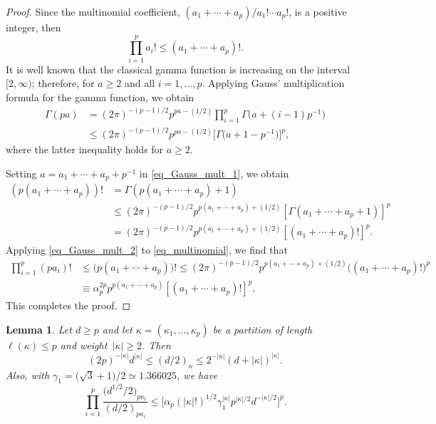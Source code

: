 \documentclass[pdftex]{sigma}
\numberwithin{equation}{section}
\newtheorem{Lemma}[Theorem]{Lemma}
\begin{document}
\begin{proof}
Since the multinomial coefficient, $(a_1+\cdots+a_p)/a_1! \cdots a_p!$, is a positive integer, then
\begin{equation}
\label{eq_multinomial}
\prod_{i=1}^p a_i! \le (a_1 + \cdots + a_p)!.
\end{equation}
It is well known that the classical gamma function is increasing on the interval $[2,\infty)$; therefore,
for $a \ge 2$ and all $i=1,\ldots,p$. Applying Gauss' multiplication formula for the gamma function, we obtain
\begin{align}
\Gamma(pa) &= (2\pi)^{-(p-1)/2} p^{pa-(1/2)} \prod_{i=1}^p \Gamma\bigl(a + (i-1)p^{-1}\bigr) \nonumber \\
&\le (2\pi)^{-(p-1)/2} p^{pa-(1/2)} \bigl[\Gamma\bigl(a + 1 - p^{-1}\bigr)\bigr]^p,\label{eq_Gauss_mult_1}
\end{align}
where the latter inequality holds for $a \ge 2$.

Setting $a = a_1+\cdots+a_p + p^{-1}$ in \eqref{eq_Gauss_mult_1}, we obtain
\begin{align}
\label{eq_Gauss_mult_2}
(p (a_1+\cdots+a_p))! &= \Gamma(p (a_1+\cdots+a_p) + 1) \nonumber \\
&\le (2\pi)^{-(p-1)/2} p^{p (a_1+\cdots+a_p) + (1/2)} [\Gamma(a_1+\cdots+a_p+1)]^p \nonumber \\
&= (2\pi)^{-(p-1)/2} p^{p (a_1+\cdots+a_p) + (1/2)} [(a_1+\cdots+a_p)!]^p.
\end{align}
Applying \eqref{eq_Gauss_mult_2} to \eqref{eq_multinomial}, we find that
\begin{align*}
\prod_{i=1}^p (p a_i)! &\le \bigl(p (a_1+\cdots+a_p)\bigr)! \le (2\pi)^{-(p-1)/2} p^{p (a_1+\cdots+a_p) + (1/2)} \bigl((a_1+\cdots+a_p)!\bigr)^p \\
&\equiv \alpha_p^{2p} p^{p(a_1+\cdots+a_p)} [(a_1+\cdots+a_p)!]^p.
\end{align*}
This completes the proof.
\end{proof}



\begin{Lemma}
\label{lemma_ineqs}
Let $d \ge p$ and let $\kappa = (\kappa_1,\ldots,\kappa_p)$ be a partition of length $\ell(\kappa) \le p$ and weight~${|\kappa| \ge 2}$. Then
\begin{equation}
\label{eq_d_kappa_ineq}
(2p)^{-|\kappa|} d^{|\kappa|} \le (d/2)_\kappa \le 2^{-|\kappa|} (d + |\kappa|)^{|\kappa|}.
\end{equation}
Also, with $\gamma_1 = \bigl(\sqrt{3}+1\bigr)/2 \simeq 1.366025$, we have
\begin{equation}
\label{eq_d_kappa_ratio_ineq3}
\prod_{i=1}^p \frac{\bigl(d^{1/2}/2\bigr)_{p \kappa_i}}{(d/2)_{p \kappa_i}} \le \bigl[\alpha_p (|\kappa|!)^{1/2} \gamma_1^{|\kappa|} p^{|\kappa|/2} d^{-|\kappa|/2}\bigr]^p.
\end{equation}
\end{Lemma}
\end{document}
